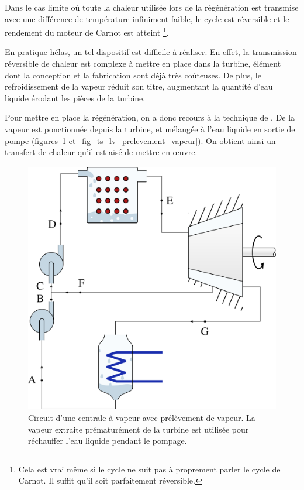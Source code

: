 		Dans le cas limite où toute la chaleur utilisée lors de la régénération est transmise avec une différence de température infiniment faible, le cycle est réversible et le rendement du moteur de Carnot est atteint%
			\footnote{Cela est vrai même si le cycle ne suit pas à proprement parler le cycle de Carnot. Il suffit qu’il soit parfaitement réversible.}\nolinebreak.

		En pratique hélas, un tel dispositif est difficile à réaliser. En effet, la transmission réversible de chaleur est complexe à mettre en place dans la turbine, élément dont la conception et la fabrication sont déjà très coûteuses. De plus, le refroidissement de la vapeur réduit son titre, augmentant la quantité d’eau liquide érodant les pièces de la turbine.

		Pour mettre en place la régénération, on a donc recours à la technique de . De la vapeur est ponctionnée depuis la turbine, et mélangée à l’eau liquide en sortie de pompe (figures~\ref{fig_cycle_prélèvement_vapeur} et~\ref{fig_ts_lv_prelevement_vapeur}). On obtient ainsi un transfert de chaleur qu’il est aisé de mettre en œuvre.

		\begin{figure}
			\begin{center}
				\includegraphics[height=11cm]{images/circuit_prelevement.png}
			\end{center}
			\caption{Circuit d’une centrale à vapeur avec prélèvement de vapeur. La vapeur extraite prématurément de la turbine est utilisée pour réchauffer l’eau liquide pendant le pompage.}
			\label{fig_cycle_prélèvement_vapeur}
		\end{figure}

